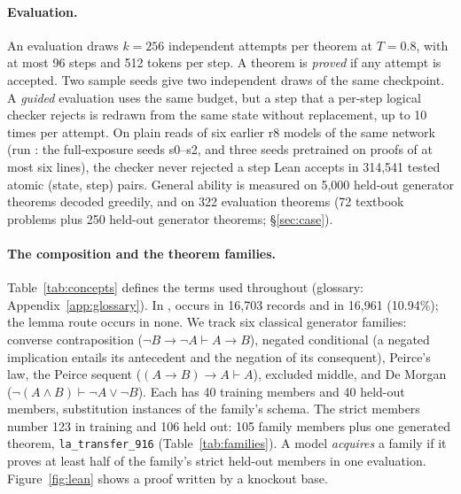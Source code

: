 \paragraph{Evaluation.} An evaluation draws $k=256$ independent attempts per theorem at $T=0.8$, with at most 96 steps
and 512 tokens per step. A theorem is \emph{proved} if any attempt is accepted. Two sample seeds give two independent
draws of the same checkpoint. A \emph{guided} evaluation uses the same budget, but a step that a per-step logical
checker rejects is redrawn from the same state without replacement, up to 10 times per attempt. On plain reads of
six earlier r8 models of the same network (run : the full-exposure seeds s0--s2, and three seeds
pretrained on proofs of at most six lines), the checker never
rejected a step Lean accepts in 314,541 tested atomic (state, step) pairs. General ability is measured on 5,000 held-out
generator theorems decoded greedily, and on 322 evaluation theorems (72 textbook problems plus 250 held-out generator
theorems; \S\ref{sec:case}).

\paragraph{The composition and the theorem families.} Table~\ref{tab:concepts} defines the terms used throughout
(glossary: Appendix~\ref{app:glossary}).
In \KT{}, \sig{} occurs in 16,703 records and \sigp{} in 16,961 (10.94\%); the lemma route occurs in none. We track six
classical generator families: converse contraposition ($\neg B \to \neg A \vdash A \to B$), negated conditional
(a negated implication entails its antecedent and the negation of its consequent), Peirce's law, the Peirce sequent ($(A\to B)\to A \vdash A$), excluded middle, and
De Morgan ($\neg(A\land B) \vdash \neg A \lor \neg B$). Each has 40 training members and 40 held-out members,
substitution instances of the family's schema. The strict members number 123 in training and 106 held out: 105 family
members plus one generated theorem, \texttt{la\_transfer\_916} (Table~\ref{tab:families}). A model \emph{acquires} a
family if it proves at least half of the family's strict held-out members in one evaluation. Figure~\ref{fig:lean}
shows a \sig{} proof written by a knockout base.

